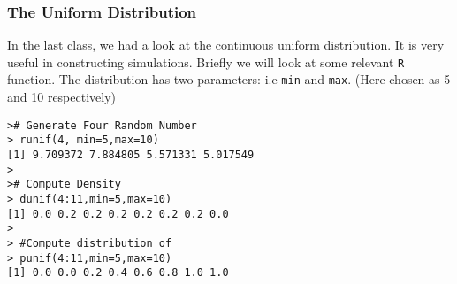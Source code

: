 
\begin{frame}[fragile]
\frametitle{The Uniform Distribution}
In the last class, we had a look at the continuous uniform distribution. It is very useful in constructing simulations. Briefly we will look at some relevant \texttt{R} function.
The distribution has two parameters: i.e \texttt{min} and \texttt{max}. (Here chosen as 5 and 10 respectively)
\begin{verbatim}
># Generate Four Random Number
> runif(4, min=5,max=10)
[1] 9.709372 7.884805 5.571331 5.017549
>
># Compute Density
> dunif(4:11,min=5,max=10)
[1] 0.0 0.2 0.2 0.2 0.2 0.2 0.2 0.0
>
> #Compute distribution of
> punif(4:11,min=5,max=10)
[1] 0.0 0.0 0.2 0.4 0.6 0.8 1.0 1.0
\end{verbatim}

\end{frame}


                             
